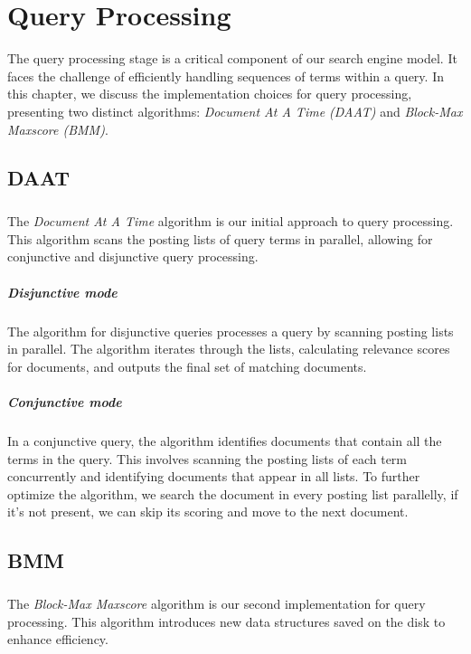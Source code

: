 \chapter{Query Processing}

The query processing stage is a critical component of our search engine model. It faces the challenge of efficiently handling 
sequences of terms within a query. In this chapter, we discuss the implementation choices for query processing, presenting two 
distinct algorithms: \textit{Document At A Time (DAAT)} and \textit{Block-Max Maxscore (BMM)}.

\section{DAAT}

\paragraph{}
The \textit{Document At A Time} algorithm is our initial approach to query processing. This algorithm scans the posting lists of 
query terms in parallel, allowing for conjunctive and disjunctive query processing.

\paragraph{Disjunctive mode}
The algorithm for disjunctive queries processes a query by scanning posting lists in parallel. 
The algorithm iterates through the lists, calculating relevance scores for documents, and outputs the final set of 
matching documents.

\paragraph{Conjunctive mode}
In a conjunctive query, the algorithm identifies documents that contain all the terms in the query. This involves scanning the 
posting lists of each term concurrently and identifying documents that appear in all lists. To further optimize the algorithm,
we search the document in every posting list parallelly, if it's not present, we can skip its scoring and move to the next document.

\section{BMM}

\paragraph{}
The \textit{Block-Max Maxscore} algorithm is our second implementation for query processing. This algorithm introduces new 
data structures saved on the disk to enhance efficiency.

